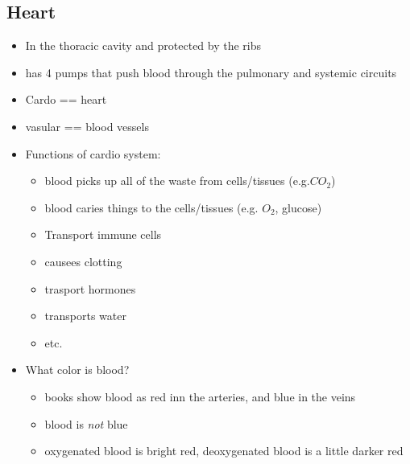 \documentclass{article}
\theoremstyle{definition}
\begin{document}
\subsection{Heart}
\begin{itemize}
	\item In the thoracic cavity and protected by the ribs
	\item has 4 pumps that push blood through the pulmonary and systemic circuits
	\item Cardo == heart
	\item vasular == blood vessels
	\item Functions of cardio system:
		\begin{itemize}
			\item blood picks up all of the waste from cells/tissues (e.g.$CO_2$)
			\item blood caries things to the cells/tissues (e.g. $O_2$, glucose)
			\item Transport immune cells
			\item causees clotting
			\item trasport hormones
			\item transports water
			\item etc.
		\end{itemize}
	\item What color is blood?
		\begin{itemize}
			\item books show blood as red inn the arteries, and blue in the veins
			\item blood is \textit{not} blue
			\item oxygenated blood is bright red, deoxygenated blood is a little darker red
		\end{itemize}
\end{itemize}
\end{document}
